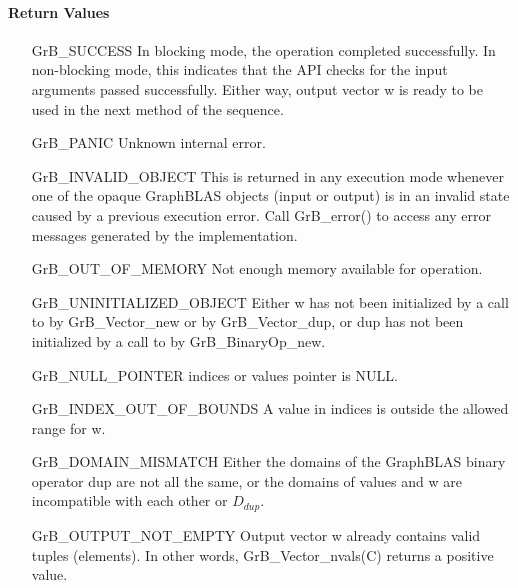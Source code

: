 \paragraph{Return Values}

\begin{itemize}[leftmargin=2.1in]
    \item[{\sf GrB\_SUCCESS}]         In blocking mode, the operation completed
    successfully. In non-blocking mode, this indicates that the API checks 
    for the input arguments passed successfully. Either way, output vector 
    {\sf w} is ready to be used in the next method of the sequence.

    \item[{\sf GrB\_PANIC}]           Unknown internal error.
    
    \item[{\sf GrB\_INVALID\_OBJECT}] This is returned in any execution mode 
    whenever one of the opaque GraphBLAS objects (input or output) is in an invalid 
    state caused by a previous execution error.  Call {\sf GrB\_error()} to access 
    any error messages generated by the implementation.

    \item[{\sf GrB\_OUT\_OF\_MEMORY}] Not enough memory available for operation.
    
    \item[{\sf GrB\_UNINITIALIZED\_OBJECT}]  Either {\sf w} has not been 
    initialized by a call to {\sf by GrB\_Vector\_new} or 
    {\sf by GrB\_Vector\_dup}, or
    {\sf dup} has not been initialized by a call to {\sf by GrB\_BinaryOp\_new}.
    
    \item[{\sf GrB\_NULL\_POINTER}]  {\sf indices} or {\sf values} 
    pointer is {\sf NULL}.

    \item[{\sf GrB\_INDEX\_OUT\_OF\_BOUNDS}] A value in {\sf indices} is outside 
    the allowed range for {\sf w}.
    
	\item[{\sf GrB\_DOMAIN\_MISMATCH}]    Either the domains of the GraphBLAS 
    binary operator {\sf dup} are not all the same, or the domains of 
    {\sf values} and {\sf w} are incompatible with each other or $D_{dup}$.
	
	\item[{\sf GrB\_OUTPUT\_NOT\_EMPTY}]    Output vector {\sf w} already contains valid tuples (elements).
	In other words, {\sf GrB\_Vector\_nvals(C)} returns a positive value.
\end{itemize}

